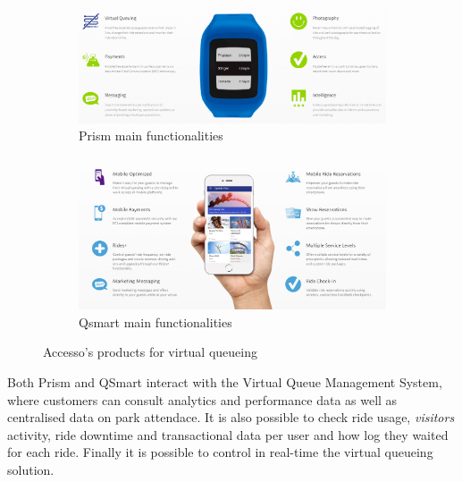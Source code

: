 \begin{figure}[H]
    \centering
    \begin{subfigure}[b]{0.85\textwidth}
        \centering
        \includegraphics[width=\textwidth]{img/prism}
        \caption{Prism main functionalities}
        \label{fig:prism}
    \end{subfigure}
    \hfill
    \begin{subfigure}[b]{0.85\textwidth}
        \centering
        \includegraphics[width=\textwidth]{img/qsmart}
        \caption{Qsmart main functionalities}
        \label{fig:qsmart}
    \end{subfigure}
    \caption{Accesso's products for virtual queueing\protect\footnotemark}
    \label{fig:prismart}
\end{figure}

Both Prism and QSmart interact with the Virtual Queue Management System, where customers can consult
analytics and performance data as well as centralised data on park attendace.
It is also possible to check ride usage, \textit{visitors} activity, ride downtime and transactional data per user and how log they waited for each ride.
Finally it is possible to control in real-time the virtual queueing solution.

